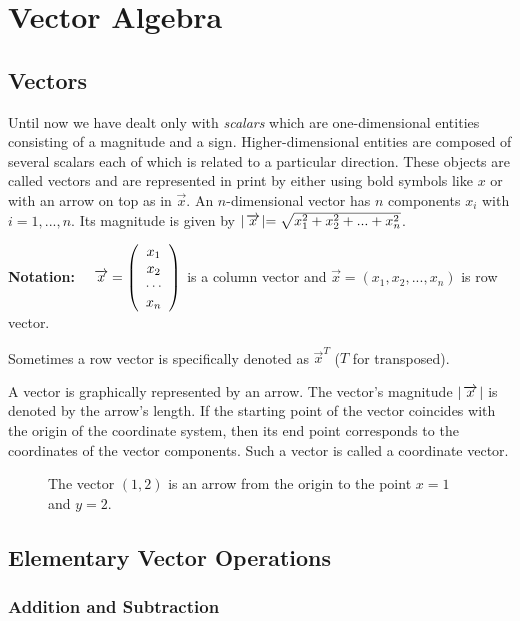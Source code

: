 

\section{Vector Algebra}
\subsection{Vectors}
Until now we have dealt only with  \emph{scalars} which are
one-dimensional entities consisting of a magnitude and a sign.
Higher-dimensional entities are composed of several scalars each
of which is related to a particular direction. These objects are called
vectors and are represented in print by either using bold symbols like
{\boldmath $x$} or with an arrow on top as in $\vec{x}$. An
$n$-dimensional vector has $n$ components $x_i$ with $i=1,...,n$.
Its magnitude is given by $\abs{\vec{x}}=\sqrt{x_1^2+x_2^2+...+x_n^2}$.

{\bf Notation:} $\quad \vec{x}=\left(\ba{c}x_1 \\ x_2 \\ \cdots \\x_n \ea \right)$
is a column vector and $\vec{x} = (x_1, x_2, ..., x_n)$ is row vector.

Sometimes a row vector is specifically denoted as $\vec{x}^T$ ($T$ for transposed).

A vector is graphically represented by an arrow. The vector's magnitude
$\abs{\vec{x}}$ is denoted by the arrow's length. If the starting point of the
vector coincides with the origin of the coordinate system, then
its end point corresponds to the coordinates of the vector components.
Such a vector is called a coordinate vector. \vs

\begin{figure}[!h]
    \centerline{\epsfxsize=10cm  } \svs
    \caption{The vector $(1,2)$ is an arrow from the origin to the point $x=1$ and $y=2$.} \label{fig27}
\end{figure}


\subsection{Elementary Vector Operations}

\subsubsection{Addition and Subtraction}


